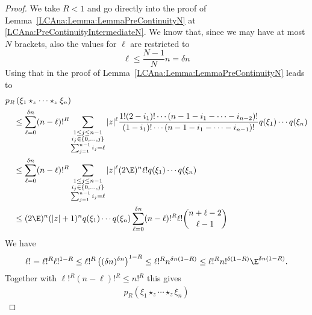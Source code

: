 \begin{proof}
    We take $R < 1$ and go directly into the proof of
    Lemma~\ref{LCAna:Lemma:LemmaPreContinuityN} at
    \eqref{LCAna:PreContinuityIntermediateN}. We know that, since we
    may have at most $N$ brackets, also the values for $\ell$ are
    restricted to
    \begin{equation*}
        \ell
        \leq
        \frac{N-1}{N} n
        =
        \delta n
    \end{equation*}
    Using that in the proof of Lemma~\ref{LCAna:Lemma:LemmaPreContinuityN} 
    leads to
    \begin{align*}
        &p_R \left(
            \xi_1 \star_z \cdots \star_z \xi_n
        \right)
        \\
        &\quad\leq
        \sum\limits_{\ell = 0}^{\delta n}
        (n - \ell)!^R
        \sum\limits_{\substack{
			1 \leq j \leq n-1 \\
			i_j \in \{0, \ldots, j\} \\
			\sum_{j = 1}^{n - 1} i_j = \ell
		}}
        |z|^{\ell}
        \frac{1!  (2 - i_1)! \cdots (n-1 - i_1 - \cdots - i_{n-2})!}
        {(1 - i_1)! \cdots (n-1 - i_1 - \cdots - i_{n-1})!}
        q(\xi_1) \cdots q(\xi_n)
        \\
        &\quad\leq
        \sum\limits_{\ell = 0}^{\delta n}
        (n - \ell)!^R
        \sum\limits_{\substack{
			1 \leq j \leq n-1 \\
			i_j \in \{0, \ldots, j\} \\
			\sum_{j = 1}^{n - 1} i_j = \ell
		}}
        |z|^{\ell} (2 \E)^n \ell!
        q(\xi_1) \cdots q(\xi_n)
        \\
        &\quad\leq
        (2 \E)^n (|z| + 1)^n
        q(\xi_1) \cdots q(\xi_n)
        \sum\limits_{\ell = 0}^{\delta n}
        (n - \ell)!^R \ell!
        \binom{n + \ell - 2}{\ell - 1}
    \end{align*}
    We have
    \begin{equation*}
        \ell!
        =
        \ell!^R
        \ell!^{1-R}
        \leq
        \ell!^R
        \left(
            (\delta n)^{\delta n}
        \right)^{1-R}
        \leq
        \ell!^R
        n^{\delta n (1-R)}
        \leq
        \ell!^R
        n!^{\delta (1 - R)}
        \E^{\delta n (1 - R)}.
    \end{equation*}
    Together with $\ell!^R (n - \ell)!^R \leq n!^R$ this gives
    \begin{align*}
        p_R \left(
            \xi_1 \star_z \cdots \star_z \xi_n
        \right)

\end{align*}
\end{proof}
